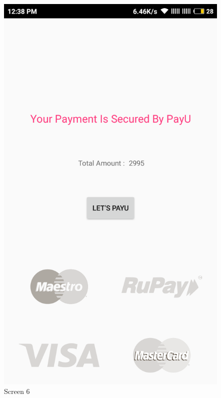 \begin{figure}[ht]
\centering
\includegraphics[scale=0.30]{images/g3.png}
\caption{Screen 6}
\end{figure}



\newpage

